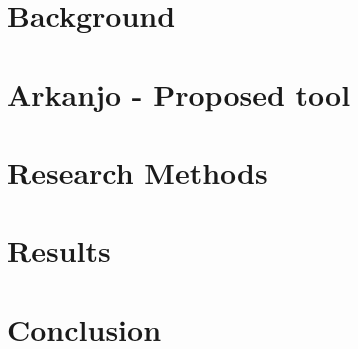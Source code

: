 
\en

\chapter{Background}
\label{cha:back}


\par

\par

\par

\par
\chapter{Arkanjo - Proposed tool}
\label{cha:tool}


\par

\par

\par

\chapter{Research Methods}
\label{cha:method}


\par

\chapter{Results}
\label{cha:results}



\chapter{Conclusion}
\label{cha:conclusion}




